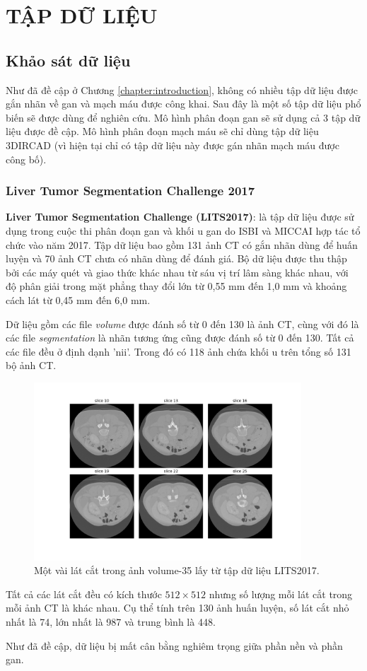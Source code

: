 \chapter{TẬP DỮ LIỆU}

\section{Khảo sát dữ liệu}
Như đã đề cập ở Chương \ref{chapter:introduction}, không có nhiều tập dữ liệu được gắn nhãn về gan và mạch máu được công khai. Sau đây là một số tập dữ liệu phổ biến sẽ được dùng để nghiên cứu.
Mô hình phân đoạn gan sẽ sử dụng cả 3 tập dữ liệu được đề cập. Mô hình phân đoạn mạch máu sẽ chỉ dùng tập dữ liệu 3DIRCAD (vì hiện tại chỉ có tập dữ liệu này được gán nhãn mạch máu được công bố).

\subsection{Liver Tumor Segmentation Challenge 2017}
\textbf{Liver Tumor Segmentation Challenge (LITS2017)}\cite{lits}: là tập dữ liệu được sử dụng trong cuộc thi phân đoạn gan và khối u gan do ISBI và MICCAI hợp tác tổ chức vào năm 2017. Tập dữ liệu bao gồm 131 ảnh CT có gắn nhãn dùng để huấn luyện và 70 ảnh CT chưa có nhãn dùng để đánh giá. Bộ dữ liệu được thu thập bởi các máy quét và giao thức khác nhau từ sáu vị trí lâm sàng khác nhau, với độ phân giải trong mặt phẳng thay đổi lớn từ 0,55 mm đến 1,0 mm và khoảng cách lát từ 0,45 mm đến 6,0 mm.\par

 Dữ liệu gồm các file \textit{volume} được đánh số từ 0 đến 130 là ảnh CT, cùng với đó là các file \textit{segmentation} là nhãn tương ứng cũng được đánh số từ 0 đến 130. Tất cả các file đều ở định dạnh 'nii'. Trong đó có 118 ảnh chứa khối u trên tổng số 131 bộ ảnh CT.

\begin{figure}[H]
    \centering
    \includegraphics[width=10cm]{images/experience/volume-35-6slice.png}
    \caption{Một vài lát cắt trong ảnh volume-35 lấy từ tập dữ liệu LITS2017.}
\end{figure}
Tất cả các lát cắt đều có kích thước $512\times 512$ nhưng số lượng mỗi lát cắt trong mỗi ảnh CT là khác nhau. Cụ thể tính trên 130 ảnh huấn luyện, số lát cắt nhỏ nhất là 74, lớn nhất là 987 và trung bình là 448.\par
Như đã đề cập, dữ liệu bị mất cân bằng nghiêm trọng giữa phần nền và phần gan. 

